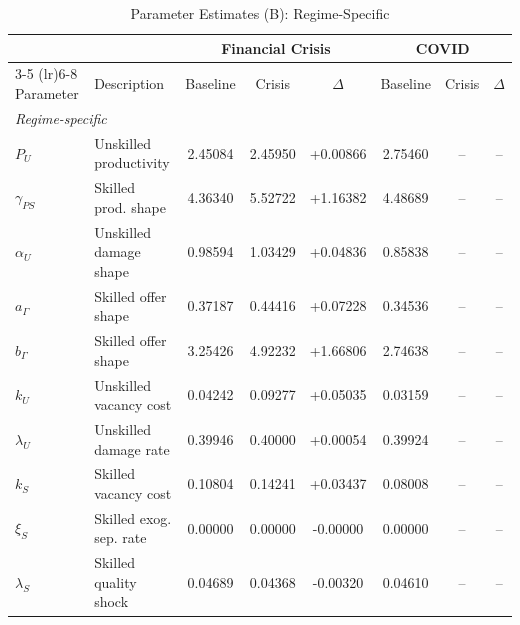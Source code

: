 \begin{table}[htbp]
  \centering
  \caption{Parameter Estimates (B): Regime-Specific}
  \label{tab:param_estimates_b}
  \small
  \begin{tabular}{llcccccc}
    \toprule
    & & \multicolumn{3}{c}{Financial Crisis} & \multicolumn{3}{c}{COVID} \\
    \cmidrule(lr){3-5} \cmidrule(lr){6-8}
    Parameter & Description & Baseline & Crisis & $\Delta$ & Baseline & Crisis & $\Delta$ \\
    \midrule
    \multicolumn{8}{l}{\textit{Regime-specific}} \\[2pt]
    \quad $P_U$ & Unskilled productivity & 2.45084 & 2.45950 & +0.00866 & 2.75460 & -- & -- \\
    \quad $\gamma_{PS}$ & Skilled prod. shape & 4.36340 & 5.52722 & +1.16382 & 4.48689 & -- & -- \\
    \quad $\alpha_U$ & Unskilled damage shape & 0.98594 & 1.03429 & +0.04836 & 0.85838 & -- & -- \\
    \quad $a_\Gamma$ & Skilled offer shape & 0.37187 & 0.44416 & +0.07228 & 0.34536 & -- & -- \\
    \quad $b_\Gamma$ & Skilled offer shape & 3.25426 & 4.92232 & +1.66806 & 2.74638 & -- & -- \\
    \quad $k_U$ & Unskilled vacancy cost & 0.04242 & 0.09277 & +0.05035 & 0.03159 & -- & -- \\
    \quad $\lambda_U$ & Unskilled damage rate & 0.39946 & 0.40000 & +0.00054 & 0.39924 & -- & -- \\
    \quad $k_S$ & Skilled vacancy cost & 0.10804 & 0.14241 & +0.03437 & 0.08008 & -- & -- \\
    \quad $\xi_S$ & Skilled exog. sep. rate & 0.00000 & 0.00000 & -0.00000 & 0.00000 & -- & -- \\
    \quad $\lambda_S$ & Skilled quality shock & 0.04689 & 0.04368 & -0.00320 & 0.04610 & -- & -- \\
    [4pt]
    \bottomrule
  \end{tabular}
\end{table}